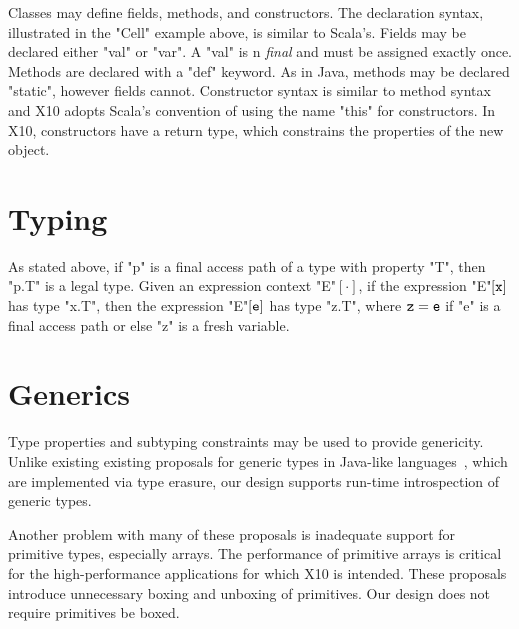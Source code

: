 \documentclass[preprint,nocopyrightspace,9pt]{sigplanconf}
\begin{document}
Classes may define fields, methods, and constructors. The
declaration syntax,
illustrated in the \xcd"Cell" example
above,
is similar to Scala's.  Fields may be
declared either \xcd"val" or \xcd"var".  A \xcd"val" is n
\emph{final} and must be assigned exactly once.  Methods are
declared with a \xcd"def" keyword.
As in Java, methods may be declared \xcd"static", however fields cannot.
Constructor syntax is
similar to method syntax and X10 adopts Scala's convention of
using the name \xcd"this" for constructors.
In X10, constructors have a return type, which constrains
the properties of the new object.

\section{Typing}

As stated above, if \xcd"p" is a final access path of a
type with property \xcd"T", then \xcd"p.T" is a legal type.
Given an expression context \xcd"E"$[\cdot]$, if
the expression \xcd"E"$[{\tt x}]$ has type \xcd"x.T",
then the expression \xcd"E"$[{\tt e}]$ has type \xcd"z.T",
where ${\tt z} = {\tt e}$ if \xcd"e" is a final access path
or else \xcd"z" is a fresh variable.
\fi

\section{Generics}

Type properties and subtyping constraints may be used to 
provide genericity.  Unlike existing 
existing proposals for generic types in
Java-like
languages~\cite{Java3,adding-wildcards,GJ,Pizza,polyj,thorup97,allen03,allen04,csharp,emir06,scala},
which 
are implemented via type erasure,
our design supports run-time introspection of generic types.

Another problem with many of these proposals is inadequate support
for primitive types, especially arrays. The performance of primitive arrays is
critical for the high-performance applications for which
X10 is intended. These proposals introduce unnecessary boxing
and unboxing of primitives.
Our design does not require primitives be boxed.
\end{document}
